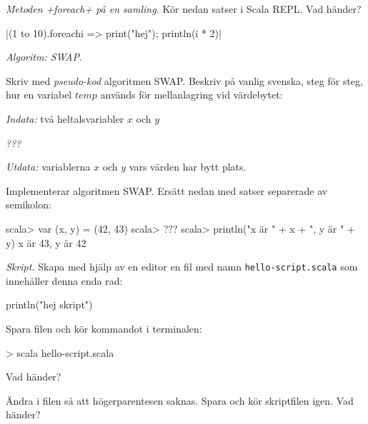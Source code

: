 \Subtask {}

\Subtask {}

\Subtask {}

\Subtask {}

\Subtask {}

\Task \emph{Metoden \code+foreach+ på en samling.} Kör nedan satser i Scala REPL. Vad händer?

\Subtask {}

\Subtask {}

\Subtask \code|(1 to 10).foreach{i => print("hej"); println(i * 2)}|

\Subtask {}

\Subtask {}


\Task \emph{Algoritm: SWAP.}

\Subtask Skriv med \emph{pseudo-kod} algoritmen SWAP. Beskriv på vanlig svenska, steg för steg, hur en variabel $temp$ används för mellanlagring vid värdebytet: 

\emph{Indata:} två heltalsvariabler $x$ och $y$ 

\emph{???}

\emph{Utdata:} variablerna $x$ och $y$ vars värden har bytt plats.

\Subtask Implementerar algoritmen SWAP. Ersätt  nedan med satser separerade av semikolon:

\begin{REPL}
scala> var (x, y) = (42, 43)
scala> ???
scala> println("x är " + x + ", y är " + y)
x är 43, y är 42
\end{REPL}



\Task \emph{Skript.} Skapa med hjälp av en editor en fil med namn \texttt{hello-script.scala} som innehåller denna enda rad:
\begin{Code}
println("hej skript")
\end{Code}
Spara filen och kör kommandot  i terminalen:
\begin{REPLnonum}
> scala hello-script.scala
\end{REPLnonum}

\Subtask Vad händer?

\Subtask Ändra i filen så att högerparentesen saknas. Spara och kör skriptfilen igen. Vad händer?


